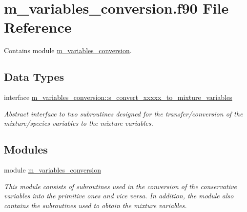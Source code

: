 \hypertarget{m__variables__conversion_8f90}{}\section{m\+\_\+variables\+\_\+conversion.\+f90 File Reference}
\label{m__variables__conversion_8f90}


Contains module \hyperlink{namespacem__variables__conversion}{m\+\_\+variables\+\_\+conversion}.  


\subsection*{Data Types}
\begin{DoxyCompactItemize}
\item 
interface \hyperlink{interfacem__variables__conversion_1_1s__convert__xxxxx__to__mixture__variables}{m\+\_\+variables\+\_\+conversion\+::s\+\_\+convert\+\_\+xxxxx\+\_\+to\+\_\+mixture\+\_\+variables}
\begin{DoxyCompactList}\small\item\em Abstract interface to two subroutines designed for the transfer/conversion of the mixture/species variables to the mixture variables. \end{DoxyCompactList}\end{DoxyCompactItemize}
\subsection*{Modules}
\begin{DoxyCompactItemize}
\item 
module \hyperlink{namespacem__variables__conversion}{m\+\_\+variables\+\_\+conversion}
\begin{DoxyCompactList}\small\item\em This module consists of subroutines used in the conversion of the conservative variables into the primitive ones and vice versa. In addition, the module also contains the subroutines used to obtain the mixture variables. \end{DoxyCompactList}\end{DoxyCompactItemize}
